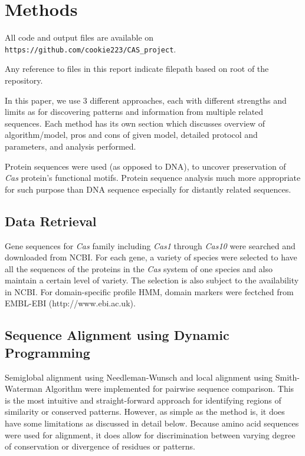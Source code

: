 \documentclass[11pt, oneside]{article}
\begin{document}
\section{Methods}

All code and output files are available on \texttt{https://github.com/cookie223/CAS\_project}. 

Any reference to files in this report indicate filepath based on root of the repository. 

In this paper, we use 3 different approaches, each with different strengths and limits as for discovering patterns and information from multiple related sequences. Each method has its own section which discusses overview of algorithm/model, pros and cons of given model, detailed protocol and parameters, and analysis performed. 

Protein sequences were used (as opposed to DNA), to uncover preservation of \textit{Cas} protein's functional motifs. Protein sequence analysis much more appropriate for such purpose than DNA sequence especially for distantly related sequences. 

\subsection{Data Retrieval}

Gene sequences for \textit{Cas} family including \textit{Cas1} through \textit{Cas10} were searched and downloaded from NCBI. For each gene, a variety of species were selected to have all the sequences of the proteins in the \textit{Cas} system of one species and also maintain a certain level of variety. The selection is also subject to the availability in NCBI. For domain-specific profile HMM, domain markers were fectched from EMBL-EBI (http://www.ebi.ac.uk). 

\subsection{Sequence Alignment using Dynamic Programming} \label{dpProtocol}

Semiglobal alignment using Needleman-Wunsch\cite{needlemanwunsch} and local alignment using Smith-Waterman Algorithm\cite{smithwaterman} were implemented for pairwise sequence comparison. This is the most intuitive and straight-forward approach for identifying regions of similarity or conserved patterns. However, as simple as the method is, it does have some limitations as discussed in detail below. Because amino acid sequences were used for alignment, it does allow for discrimination between varying degree of conservation or divergence of residues or patterns. 
\end{document}
